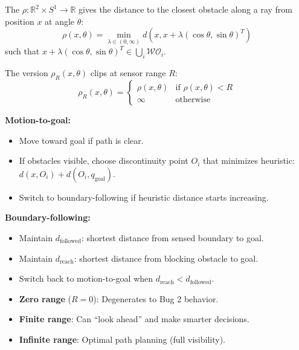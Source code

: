 \begin{defbox}
The  $\rho: \mathbb{R}^2 \times S^1 \to \mathbb{R}$ gives the distance to the closest obstacle along a ray from position $x$ at angle $\theta$:
\[
\rho(x, \theta) = \min_{\lambda \in (0,\infty)} d\left(x, x + \lambda(\cos\theta, \sin\theta)^T\right)
\]
such that $x + \lambda(\cos\theta, \sin\theta)^T \in \bigcup_i \mathcal{WO}_i$.

The  version $\rho_R(x,\theta)$ clips at sensor range $R$:
\[
\rho_R(x,\theta) = \begin{cases} \rho(x,\theta) & \text{if } \rho(x,\theta) < R \\ \infty & \text{otherwise} \end{cases}
\]
\end{defbox}

\begin{thmbox}
\textbf{Motion-to-goal:}
\begin{itemize}
  \item Move toward goal if path is clear.
  \item If obstacles visible, choose discontinuity point $O_i$ that minimizes heuristic: $d(x, O_i) + d(O_i, q_{\text{goal}})$.
  \item Switch to boundary-following if heuristic distance starts increasing.
\end{itemize}

\textbf{Boundary-following:}
\begin{itemize}
  \item Maintain $d_{\text{followed}}$: shortest distance from sensed boundary to goal.
  \item Maintain $d_{\text{reach}}$: shortest distance from blocking obstacle to goal.
  \item Switch back to motion-to-goal when $d_{\text{reach}} < d_{\text{followed}}$.
\end{itemize}
\end{thmbox}

\begin{tipbox}
\begin{itemize}
  \item \textbf{Zero range} ($R = 0$): Degenerates to Bug 2 behavior.
  \item \textbf{Finite range}: Can ``look ahead'' and make smarter decisions.
  \item \textbf{Infinite range}: Optimal path planning (full visibility).
\end{itemize}
\end{tipbox}

